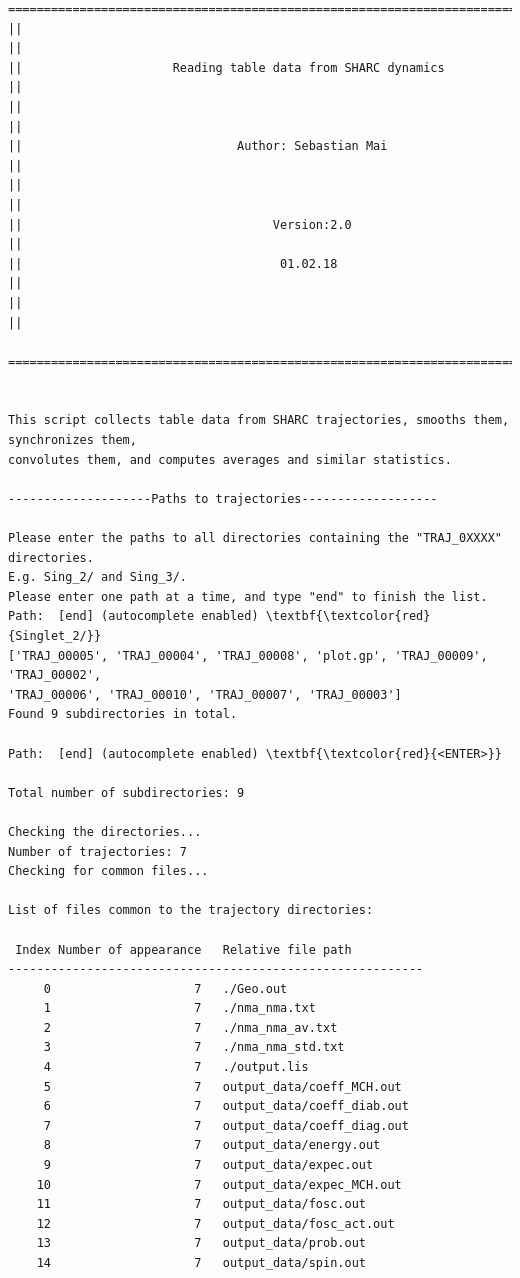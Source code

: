 \documentclass[a4paper,11pt,DIV=15,openany]{scrbook}
\begin{document}
\begin{oframed}
\footnotesize\begin{Verbatim}[commandchars=\\\{\}]
  ================================================================================
||                                                                                ||
||                     Reading table data from SHARC dynamics                     ||
||                                                                                ||
||                              Author: Sebastian Mai                             ||
||                                                                                ||
||                                   Version:2.0                                  ||
||                                    01.02.18                                    ||
||                                                                                ||
  ================================================================================


This script collects table data from SHARC trajectories, smooths them, synchronizes them,
convolutes them, and computes averages and similar statistics.
  
--------------------Paths to trajectories-------------------

Please enter the paths to all directories containing the "TRAJ_0XXXX" directories.
E.g. Sing_2/ and Sing_3/. 
Please enter one path at a time, and type "end" to finish the list.
Path:  [end] (autocomplete enabled) \textbf{\textcolor{red}{Singlet_2/}}
['TRAJ_00005', 'TRAJ_00004', 'TRAJ_00008', 'plot.gp', 'TRAJ_00009', 'TRAJ_00002',
'TRAJ_00006', 'TRAJ_00010', 'TRAJ_00007', 'TRAJ_00003']
Found 9 subdirectories in total.

Path:  [end] (autocomplete enabled) \textbf{\textcolor{red}{<ENTER>}}

Total number of subdirectories: 9

Checking the directories...
Number of trajectories: 7
Checking for common files...

List of files common to the trajectory directories:

 Index Number of appearance   Relative file path
----------------------------------------------------------
     0                    7   ./Geo.out
     1                    7   ./nma_nma.txt
     2                    7   ./nma_nma_av.txt
     3                    7   ./nma_nma_std.txt
     4                    7   ./output.lis
     5                    7   output_data/coeff_MCH.out
     6                    7   output_data/coeff_diab.out
     7                    7   output_data/coeff_diag.out
     8                    7   output_data/energy.out
     9                    7   output_data/expec.out
    10                    7   output_data/expec_MCH.out
    11                    7   output_data/fosc.out
    12                    7   output_data/fosc_act.out
    13                    7   output_data/prob.out
    14                    7   output_data/spin.out


\end{Verbatim}
\end{oframed}
\end{document}
